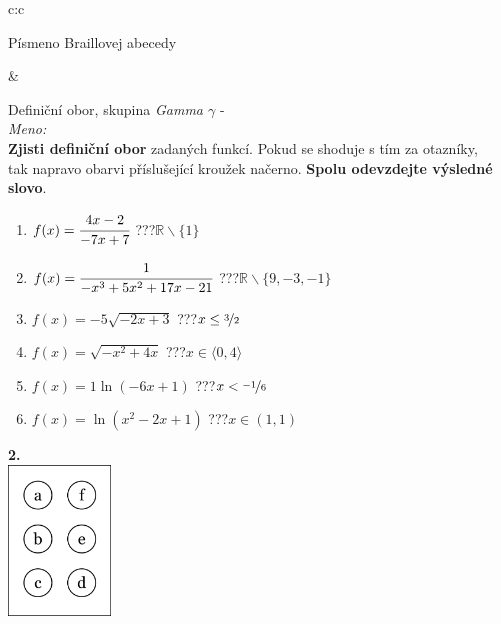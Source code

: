 \documentclass[10pt]{report}
\begin{document}
\begin{tabular}{c:c}
\begin{minipage}[c][99mm][t]{0.49\linewidth}
\begin{center}
\begin{minipage}{0.20\linewidth}
\begin{center}
{\small Písmeno Braillovej abecedy}
\end{center}
\end{minipage}
\end{center}
\end{minipage}
&
\begin{minipage}[c][99mm][t]{0.49\linewidth}
\begin{center}
\vspace{7mm}
{\huge Definiční obor, skupina \textit{Gamma $\gamma$} -}\\[4.5mm]
\textit{Meno:}\phantom{xxxxxxxxxxxxxxxxxxxxxxxxxxxxxxxxxxxxxxxxxxxxxxxxxxxxxxxxxxxxxxxxx}\\[3.5mm]
\textbf{Zjisti definiční obor} zadaných funkcí. Pokud se shoduje s tím za otazníky,\\tak napravo obarvi příslušející kroužek načerno. \textbf{Spolu odevzdejte výsledné slovo}.\\[3mm]
\begin{minipage}{0.77\linewidth}
\begin{center}
\begin{varwidth}{\textwidth}
\begin{enumerate}
\normalsize
\item $f(x)=\cfrac{4x-2}{-7x+7}$\quad \dotfill\; ???\;\dotfill \quad $\mathbb{R}\smallsetminus\{1\}$
\item $f(x)=\cfrac{1}{-x^3+5x^2+17x-21}$\quad \dotfill\; ???\;\dotfill \quad $\mathbb{R}\smallsetminus\{9,-3,-1\}$
\item $f(x)=-5\sqrt{-2x+3}$\quad \dotfill\; ???\;\dotfill \quad $x\leq\nicefrac{3}{2}$
\item $f(x)=\sqrt{-x^2+4x}$\quad \dotfill\; ???\;\dotfill \quad $x\in\langle0 , 4\rangle$
\item $f(x)=1\ln{(-6x+1)}$\quad \dotfill\; ???\;\dotfill \quad $x<\nicefrac{-1}{6}$
\item $f(x)=\ln{(x^2-2x+1)}$\quad \dotfill\; ???\;\dotfill \quad $x\in(1 , 1)$
\end{enumerate}
\end{varwidth}
\end{center}
\end{minipage}
\begin{minipage}{0.20\linewidth}
\begin{center}
{\Huge\bfseries 2.} \\[2mm]
\includegraphics[height=40mm]{../images/braille.png}

\end{center}
\end{minipage}
\end{center}
\end{minipage}
\end{tabular}
\end{document}

